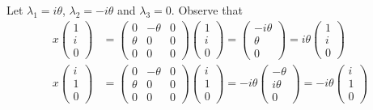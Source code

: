 \documentclass[a4paper]{article}
\begin{document}
\begin{solution}
Let \( {\lambda}_{1} = i \theta  \), \( {\lambda}_{2} = - i \theta  \) and \( {\lambda}_{3}  = 0  \). Observe that 
\begin{align*}
    x \begin{pmatrix} 1 \\ i \\ 0  \end{pmatrix}  &= \begin{pmatrix} 0 & - \theta & 0 \\ \theta & 0 & 0 \\ 0 & 0 & 0    \end{pmatrix} \begin{pmatrix} 1 \\ i \\ 0  \end{pmatrix} = \begin{pmatrix}  - i \theta \\ \theta \\ 0  \end{pmatrix}  = i \theta \begin{pmatrix} 1 \\ i \\ 0  \end{pmatrix}     \\
    x \begin{pmatrix}  i \\ 1 \\ 0  \end{pmatrix} &=  \begin{pmatrix} 0 & - \theta & 0 \\ \theta & 0 & 0 \\ 0 & 0 & 0    \end{pmatrix} \begin{pmatrix} i \\ 1 \\ 0  \end{pmatrix}  = - i \theta \begin{pmatrix} - \theta \\ i \theta  \\ 0  \end{pmatrix} = - i \theta \begin{pmatrix}  i \\ 1 \\ 0  \end{pmatrix}  \\

\end{align*}
\end{solution}
\end{document}
